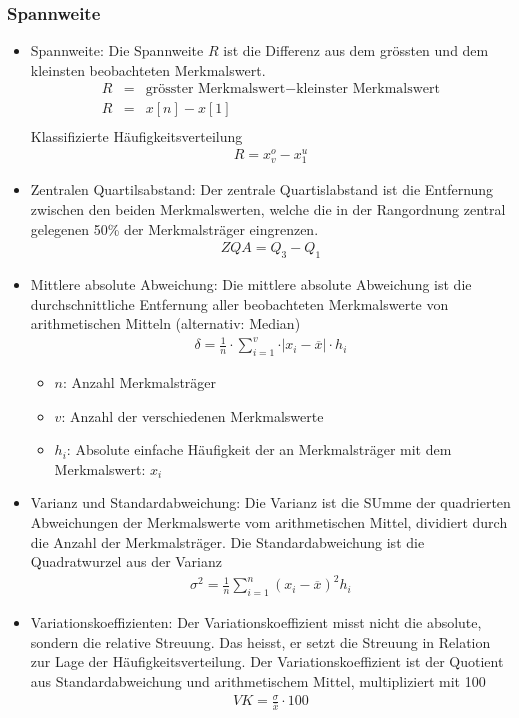 \subsubsection{Spannweite}
\begin{itemize}
	\item Spannweite: Die Spannweite $R$ ist die Differenz aus dem grössten und dem kleinsten beobachteten Merkmalswert.
	\begin{eqnarray}
	R&=&\mbox{grösster Merkmalswert}-\mbox{kleinster Merkmalswert}\\
	R&=&x[n]-x[1]\\
	\end{eqnarray}
	Klassifizierte Häufigkeitsverteilung
	\begin{eqnarray}
	R=x_{v}^{o}-x_{1}^{u}
	\end{eqnarray}
	\item Zentralen Quartilsabstand: Der zentrale Quartislabstand ist die Entfernung zwischen den beiden Merkmalswerten, welche die in der Rangordnung zentral gelegenen 50\% der Merkmalsträger eingrenzen.
	\begin{eqnarray}
	ZQA=Q_3-Q_1
	\end{eqnarray}
	\pagebreak[4]
	\item Mittlere absolute Abweichung: Die mittlere absolute Abweichung ist die durchschnittliche Entfernung aller beobachteten Merkmalswerte von arithmetischen Mitteln (alternativ: Median)
	\begin{eqnarray}
	\delta= \frac{1}{n}\cdot \sum_{i=1}^{v}\cdot \vert x_i - \overline{x} \vert \cdot h_i
	\end{eqnarray}
	\begin{itemize}
		\item $n$: Anzahl Merkmalsträger
		\item $v$: Anzahl der verschiedenen Merkmalswerte
		\item $h_i$: Absolute einfache Häufigkeit der an Merkmalsträger mit dem Merkmalswert: $x_i$
	\end{itemize}
	\item Varianz und Standardabweichung: Die Varianz ist die SUmme der quadrierten Abweichungen der Merkmalswerte vom arithmetischen Mittel, dividiert durch die Anzahl der Merkmalsträger. Die Standardabweichung ist die Quadratwurzel aus der Varianz
	\begin{eqnarray}
	\sigma^{2}=\frac{1}{n}\sum_{i=1}^{n}(x_i-\overline{x})^2 h_i
	\end{eqnarray}
	\item Variationskoeffizienten: Der Variationskoeffizient misst nicht die absolute, sondern die relative Streuung. Das heisst, er setzt die Streuung in Relation zur Lage der Häufigkeitsverteilung. Der Variationskoeffizient ist der Quotient aus Standardabweichung und arithmetischem Mittel, multipliziert mit 100
	\begin{eqnarray}
	VK=\frac{\sigma}{\overline{x}}\cdot 100
	\end{eqnarray}
\end{itemize}
\pagebreak[2]
